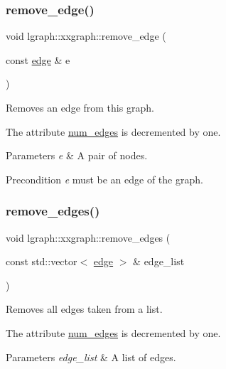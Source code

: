 \subsubsection{\texorpdfstring{remove\+\_\+edge()}{remove\_edge()}\hspace{0.1cm}{\footnotesize\ttfamily [2/2]}}
{\footnotesize\ttfamily void lgraph\+::xxgraph\+::remove\+\_\+edge (\begin{DoxyParamCaption}\item[{const \hyperlink{namespacelgraph_a76bd7d50719f03de7a85db259d80d572}{edge} \&}]{e }\end{DoxyParamCaption})\hspace{0.3cm}{\ttfamily [inherited]}}



Removes an edge from this graph. 

The attribute \hyperlink{classlgraph_1_1xxgraph_a6765a9a3be42f6e0f824635c593b35d7}{num\+\_\+edges} is decremented by one. 
\begin{DoxyParams}{Parameters}
{\em e} & A pair of nodes. \\
\hline
\end{DoxyParams}
\begin{DoxyPrecond}{Precondition}
{\itshape e} must be an edge of the graph. 
\end{DoxyPrecond}
\mbox{\label{classlgraph_1_1xxgraph_aef7c4bf62f3f4db362b2d3accb3b6d3d}} 
\subsubsection{\texorpdfstring{remove\+\_\+edges()}{remove\_edges()}}
{\footnotesize\ttfamily void lgraph\+::xxgraph\+::remove\+\_\+edges (\begin{DoxyParamCaption}\item[{const std\+::vector$<$ \hyperlink{namespacelgraph_a76bd7d50719f03de7a85db259d80d572}{edge} $>$ \&}]{edge\+\_\+list }\end{DoxyParamCaption})\hspace{0.3cm}{\ttfamily [inherited]}}



Removes all edges taken from a list. 

The attribute \hyperlink{classlgraph_1_1xxgraph_a6765a9a3be42f6e0f824635c593b35d7}{num\+\_\+edges} is decremented by one. 
\begin{DoxyParams}{Parameters}
{\em edge\+\_\+list} & A list of edges. \\
\hline
\end{DoxyParams}
\mbox{\label{classlgraph_1_1wdgraph_aa6861b63fccd1def268f3ff84d31da52}} 
